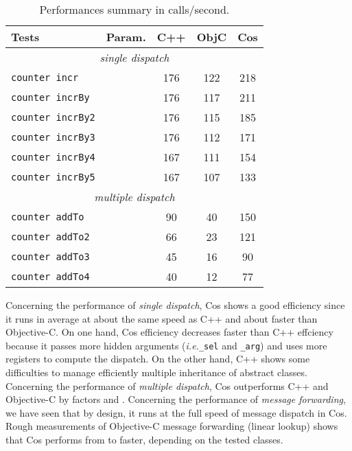 \documentclass[preprint,10pt]{sigplanconf}
\newcommand{\abbrev}[1]{{\em #1}\xspace}
\newcommand{\ie}{\abbrev{i.e.}}
\newcommand{\ProgLang}[1]{{\sc #1}\xspace}
\newcommand{\Cpp}       {\ProgLang{C{\small ++}}}
\newcommand{\Cos}       {\ProgLang{Cos}}
\newcommand{\Objc}      {\ProgLang{Objective-C}}
\newcommand{\code}[1]{\lstinline[language=COS,style=samplecode]|#1|}
\begin{document}
\begin{table}
\begin{center}
{\small \begin{tabular}{l|c|ccc} \hline
\multicolumn{1}{l}{Tests}& \multicolumn{1}{l}{Param.}
                                            & \Cpp & {\sc ObjC} & \Cos \\ \hline
\multicolumn{5}{c}{{\em single dispatch}} \\
\code{counter incr}          &         & 176  & 122        & 218  \\
\code{counter incrBy}        &         & 176  & 117        & 211  \\
\code{counter incrBy2}       &         & 176  & 115        & 185  \\
\code{counter incrBy3}       &         & 176  & 112        & 171  \\
\code{counter incrBy4}       &         & 167  & 111        & 154  \\
\code{counter incrBy5}       &         & 167  & 107        & 133  \\ \hline
\multicolumn{5}{c}{{\em multiple dispatch}} \\
\code{counter addTo}         &         & 90   & 40         & 150  \\
\code{counter addTo2}        &         & 66   & 23         & 121  \\
\code{counter addTo3}        &         & 45   & 16         & 90   \\
\code{counter addTo4}        &         & 40   & 12         & 77   \\
\end{tabular}}
\end{center}
\caption{Performances summary in  calls/second.\label{tbl:perf}}
\end{table}

Concerning the performance of {\em single dispatch}, \Cos shows a good efficiency since it runs in average at about the same speed as \Cpp and about  faster than \Objc. On one hand, \Cos efficiency decreases faster than \Cpp effciency because it passes more hidden arguments (\ie \code{_sel} and \code{_arg}) and uses more registers to compute the dispatch. On the other hand, \Cpp shows some difficulties to manage efficiently multiple inheritance of abstract classes.
Concerning the performance of {\em multiple dispatch}, \Cos outperforms \Cpp and \Objc by factors  and .
Concerning the performance of {\em message forwarding}, we have seen that by design, it runs at the full speed of message dispatch in \Cos. Rough measurements of \Objc message forwarding (linear lookup) shows that \Cos performs from  to  faster, depending on the tested classes.
\end{document}
